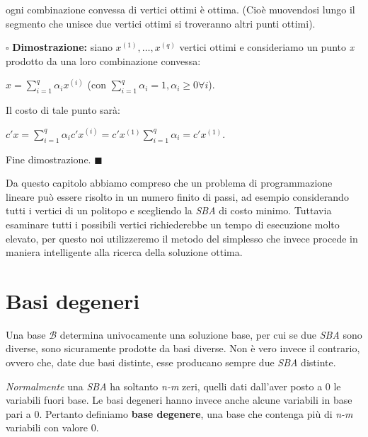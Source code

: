 \documentclass[11pt]{book}
\begin{document}
\par{} ogni combinazione convessa di vertici
ottimi \`e ottima. (Cio\`e muovendosi lungo il segmento che unisce due
vertici ottimi si troveranno altri punti ottimi).

\par\bigskip
$\square$ {\bf Dimostrazione:} siano $x^{(1)},\dots,x^{(q)}$ vertici
ottimi e consideriamo un punto {\em x} prodotto da una loro
combinazione convessa:

\begin{center}
$x = \sum\limits_{i=1}^q \alpha_i x^{(i)}$ (con $\sum\limits_{i=1}^q
  \alpha_i = 1, \alpha_i \geq 0 \forall i$).
\end{center}

Il costo di tale punto sar\`a:

\begin{center}
$c'x = \sum\limits_{i=1}^q \alpha_i c' x^{(i)} = c' x^{(1)}
  \sum\limits_{i=1}^q \alpha_i = c'x^{(1)}$.
\end{center}
Fine dimostrazione. $\blacksquare$
\newline
\vspace{11pt}

Da questo capitolo abbiamo compreso che un problema di programmazione
lineare pu\`o essere risolto in un numero finito di passi, ad esempio
considerando tutti i vertici di un politopo e scegliendo la {\em SBA}
di costo minimo. Tuttavia esaminare tutti i possibili vertici
richiederebbe un tempo di esecuzione molto elevato, per questo noi
utilizzeremo il metodo del simplesso che invece procede in maniera
intelligente alla ricerca della soluzione ottima.


\section{Basi degeneri}

Una base $\mathcal{B}$ determina univocamente una soluzione base, per
cui se due {\em SBA} sono diverse, sono sicuramente prodotte da basi
diverse. Non \`e vero invece il contrario, ovvero che, date due basi
distinte, esse producano sempre due {\em SBA} distinte.

{\em Normalmente} una {\em SBA} ha soltanto {\em n-m} zeri, quelli
dati dall'aver posto a 0 le variabili fuori base. Le basi degeneri
hanno invece anche alcune variabili in base pari a 0. Pertanto
definiamo {\bf base degenere}, una base che contenga pi\`u di {\em
  n-m} variabili con valore 0.
\newline
\end{document}
